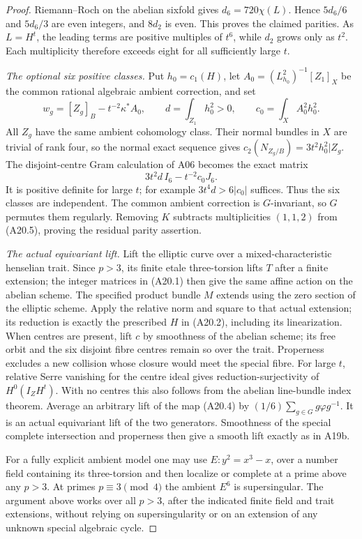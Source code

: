\documentclass[11pt]{article}
\theoremstyle{remark}\newtheorem{remark}[theorem]{Remark}
\begin{document}
\begin{proof}
Riemann--Roch on the abelian sixfold gives
$d_6=720\chi(L)$. Hence $5d_6/6$ and $5d_6/3$ are
even integers, and $8d_2$ is even. This proves the
claimed parities. As $L=H^t$, the leading terms are
positive multiples of $t^6$, while $d_2$ grows only
as $t^2$. Each multiplicity therefore exceeds eight
for all sufficiently large $t$.

\emph{The optional six positive classes.}
Put $h_0=c_1(H)$, let $A_0=(L_{h_0}^2)^{-1}[Z_1]_X$
be the common rational algebraic ambient correction,
and set
\[
       w_g=[Z_g]_B-t^{-2}\kappa^*A_0,\qquad
       d=\int_{Z_1}h_0^2>0,\qquad
       c_0=\int_XA_0^2h_0^2.
 \tag{A20.13}
\]
All $Z_g$ have the same ambient cohomology class. Their
normal bundles in $X$ are trivial of rank four, so the
normal exact sequence gives
$c_2(N_{Z_g/B})=3t^2h_0^2|Z_g$. The disjoint-centre
Gram calculation of A06 becomes the exact matrix
\[
                      3t^2d\,I_6-t^{-2}c_0J_6.
 \tag{A20.14}
\]
It is positive definite for large $t$; for example
$3t^4d>6|c_0|$ suffices. Thus the six classes are
independent. The common ambient correction is
$G$-invariant, so $G$ permutes them regularly.
Removing $K$ subtracts multiplicities $(1,1,2)$
from (A20.5), proving the residual parity assertion.

\emph{The actual equivariant lift.}
Lift the elliptic curve over a mixed-characteristic
henselian trait. Since $p>3$, its finite etale
three-torsion lifts $T$ after a finite extension;
the integer matrices in (A20.1) then give the same
affine action on the abelian scheme. The specified
product bundle $M$ extends using the zero section of
the elliptic scheme. Apply the relative norm and square
to that actual extension; its reduction is exactly
the prescribed $H$ in (A20.2), including its linearization.
When centres are present, lift
$c$ by smoothness of the abelian scheme; its free
orbit and the six disjoint fibre centres remain so
over the trait. Properness excludes a new collision
whose closure would meet the special fibre.
For large $t$, relative Serre vanishing for the
centre ideal gives reduction-surjectivity of
$H^0(I_ZH^t)$. With no centres this also follows
from the abelian line-bundle index theorem.
Average an arbitrary lift of the map (A20.4) by
$(1/6)\sum_{g\in G}g\varphi g^{-1}$. It is an actual
equivariant lift of the two generators. Smoothness
of the special complete intersection and properness
then give a smooth lift exactly as in A19b.

For a fully explicit ambient model one may use
$E:y^2=x^3-x$, over a number field containing its
three-torsion and then localize or complete at a
prime above any $p>3$. At primes $p\equiv3\pmod4$
the ambient $E^6$ is supersingular. The argument above
works over all $p>3$, after the indicated finite
field and trait extensions, without relying on
supersingularity or on an extension of any unknown
special algebraic cycle.
\end{proof}
\end{document}
